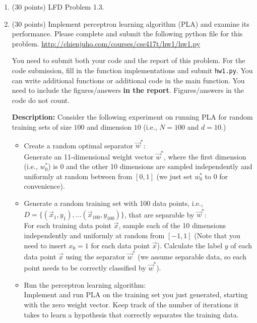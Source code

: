 \documentclass[11pt]{article}
\begin{document}
\begin{enumerate}


\item (30 points) LFD Problem 1.3. 

\item (30 points) 
  Implement perceptron learning algorithm (PLA) and examine its performance. 
  Please complete and submit the following python file for this problem. 
  \url{http://chienjuho.com/courses/cse417t/hw1/hw1.py}
  
  You need to submit both your code and the report of this problem. 
  For the code submission, fill in the function implementations and submit \texttt{hw1.py}. You can write additional functions or additional code in the main function.
  You need to include the figures/answers \textbf{in the report}. Figures/answers in the code do not count.
  
  \textbf{Description:} Consider the following experiment on running PLA for random training sets of size $100$ and dimension $10$ (i.e., $N=100$ and $d=10$.)
  \begin{itemize}
  \item Create a random optimal separator $\vec{w}^*$:\\
    Generate an 11-dimensional weight vector $\vec{w}^*$,
    where the first dimension (i.e., $w^*_0$) is 0 and the other 10 dimensions are
    sampled independently and uniformly at random between from $[0,1]$
    (we just set $w^*_0$ to 0 for convenience).
  \item Generate a random training set with 100 data points, i.e., $D=\{(\vec{x}_1,y_1),...(\vec{x}_{100},y_{100})\}$, that are separable by $\vec{w}^*$:\\
  For each training data point $\vec{x}$, sample each of the 10 dimensions independently and uniformly at random from $[-1,1]$ (Note that you need to insert $x_0=1$ for each data point $\vec{x}$).
    Calculate the label $y$ of each data point $\vec{x}$ using the separator $\vec{w}^*$ (we assume separable data, so each point needs to be correctly classified by $\vec{w}^*$).
  \item Run the perceptron learning algorithm:\\ 
    Implement and run PLA on the training set you just generated, 
    starting with the zero weight vector. 
    Keep track of the number of iterations it takes to learn a hypothesis
    that correctly separates the training data. 
  \end{itemize}


\end{enumerate}
\end{document}
